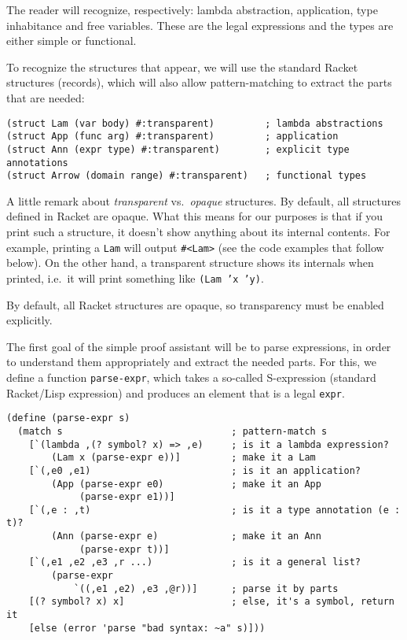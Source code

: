 The reader will recognize, respectively: lambda abstraction, application,
type inhabitance and free variables. These are the legal expressions
and the types are either simple or functional.

To recognize the structures that appear, we will use the standard
Racket structures (records), which will also allow pattern-matching to
extract the parts that are needed:
{
  \small
\begin{verbatim}
(struct Lam (var body) #:transparent)         ; lambda abstractions
(struct App (func arg) #:transparent)         ; application
(struct Ann (expr type) #:transparent)        ; explicit type annotations
(struct Arrow (domain range) #:transparent)   ; functional types
\end{verbatim}
}

A little remark about \emph{transparent} vs.\ \emph{opaque} structures.
By default, all structures defined in Racket are opaque. What this means
for our purposes is that if you print such a structure, it doesn't
show anything about its internal contents. For example, printing
a \texttt{Lam} will output \texttt{\#<Lam>} (see the code examples
that follow below). On the other hand, a transparent structure shows
its internals when printed, i.e.\ it will print something like
\texttt{(Lam 'x 'y)}.

By default, all Racket structures are opaque, so transparency must
be enabled explicitly.

The first goal of the simple proof assistant will be to parse expressions,
in order to understand them appropriately and extract the needed parts.
For this, we define a function \texttt{parse-expr}, which takes a so-called
S-expression (standard Racket/Lisp expression) and produces an element
that is a legal \texttt{expr}.
{
  \small
\begin{verbatim}
(define (parse-expr s)
  (match s                              ; pattern-match s
    [`(lambda ,(? symbol? x) => ,e)     ; is it a lambda expression?
        (Lam x (parse-expr e))]         ; make it a Lam
    [`(,e0 ,e1)                         ; is it an application?
        (App (parse-expr e0)            ; make it an App
             (parse-expr e1))]
    [`(,e : ,t)                         ; is it a type annotation (e : t)?
        (Ann (parse-expr e)             ; make it an Ann
             (parse-expr t))]
    [`(,e1 ,e2 ,e3 ,r ...)              ; is it a general list?
        (parse-expr 
            `((,e1 ,e2) ,e3 ,@r))]      ; parse it by parts
    [(? symbol? x) x]                   ; else, it's a symbol, return it
    [else (error 'parse "bad syntax: ~a" s)]))
\end{verbatim}
}

